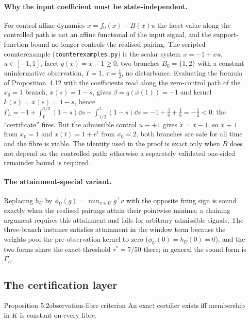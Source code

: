 \paragraph{Why the input coefficient must be state-independent.} For control-affine dynamics $\dot x=f_0(x)+B(x)u$ the facet value along the controlled path is not an affine functional of the input signal, and the support-function bound no longer controls the realised pairing. The scripted counterexample (\texttt{counterexamples.py}) is the scalar system $\dot x=-1+xu$, $u\in[-1,1]$, facet $q(x)=x-1\ge0$, two branches $B_0=\{1,2\}$ with a constant uninformative observation, $T=1$, $\tau=\tfrac12$, no disturbance. Evaluating the formula of Proposition~4.12 with the coefficients read along the zero-control path of the $x_0=1$ branch, $\bar x(s)=1-s$, gives $\beta=q(\bar x(1))=-1$ and kernel $k(s)=\bar x(s)=1-s$, hence $\Gamma_h=-1+\int_0^{1/2}(1-s)\dd s+\int_{1/2}^1(1-s)\dd s=-1+\tfrac38+\tfrac18=-\tfrac12<0$: the ``certificate'' fires. But the admissible control $u\equiv+1$ gives $\dot x=x-1$, so $x\equiv1$ from $x_0=1$ and $x(t)=1+e^{t}$ from $x_0=2$; both branches are safe for all time and the fibre is viable. The identity used in the proof is exact only when $B$ does not depend on the controlled path; otherwise a separately validated one-sided remainder bound is required.

\paragraph{The attainment-special variant.} Replacing $h_U$ by $\phi_U(g)=\min_{v\in U}g^\top v$ with the opposite firing sign is sound exactly when the realised pairings attain their pointwise minima; a chaining argument requires this attainment and fails for arbitrary admissible signals. The three-branch instance satisfies attainment in the window term because the weights pool the pre-observation kernel to zero ($\phi_U(0)=h_U(0)=0$), and the two forms share the exact threshold $\tau^*=7/50$ there; in general the sound form is $\Gamma_h$.

\subsection{The certification layer}\label{S:cert}

\begin{restated}{Proposition 5.2}{observation-fibre criterion}
An exact certifier exists iff membership in $K$ is constant on every fibre.
\end{restated}

